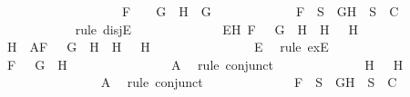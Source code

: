 \begin{isabellebody}
\ \ \ \ \ \ \ \ \ \ \ \ \ \ \ \ \ \ \ F\ {\isacharequal}\ \isactrlbold {\isasymnot}\ {\isacharparenleft}\isactrlbold {\isasymnot}\ G{\isacharparenright}\ {\isasymand}\ H\ {\isacharequal}\ G{\isachardoublequoteclose}\ \isanewline
\ \ \ \ \ \ \ \ \ \ \isamarkupfalse%
\ {\isachardoublequoteopen}F\ {\isasymin}\ S\ {\isasymlongrightarrow}\ {\isacharbraceleft}G{\isacharcomma}H{\isacharbraceright}\ {\isasymunion}\ S\ {\isasymin}\ C{\isachardoublequoteclose}\isanewline
\ \ \ \ \ \ \ \ \ \ \isamarkupfalse%
\ {\isacharparenleft}rule\ disjE{\isacharparenright}\isanewline
\ \ \ \ \ \ \ \ \ \ \ \ \isamarkupfalse%
\ E{}{\isacharcolon}{\isachardoublequoteopen}{\isasymexists}H{}{\isachardot}\ F\ {\isacharequal}\ \isactrlbold {\isasymnot}\ {\isacharparenleft}G\ \isactrlbold {\isasymrightarrow}\ H{}{\isacharparenright}\ {\isasymand}\ H\ {\isacharequal}\ \isactrlbold {\isasymnot}\ H{}{\isachardoublequoteclose}\isanewline
\ \ \ \ \ \ \ \ \ \ \ \ \isamarkupfalse%
\ H{}\ \ A{}{\isacharcolon}{\isachardoublequoteopen}F\ {\isacharequal}\ \isactrlbold {\isasymnot}\ {\isacharparenleft}G\ \isactrlbold {\isasymrightarrow}\ H{}{\isacharparenright}\ {\isasymand}\ H\ {\isacharequal}\ \isactrlbold {\isasymnot}\ H{}{\isachardoublequoteclose}\isanewline
\ \ \ \ \ \ \ \ \ \ \ \ \ \ \isamarkupfalse%
\ E{}\ \isamarkupfalse%
\ {\isacharparenleft}rule\ exE{\isacharparenright}\isanewline
\ \ \ \ \ \ \ \ \ \ \ \ \isamarkupfalse%
\ {\isachardoublequoteopen}F\ {\isacharequal}\ \isactrlbold {\isasymnot}\ {\isacharparenleft}G\ \isactrlbold {\isasymrightarrow}\ H{}{\isacharparenright}{\isachardoublequoteclose}\isanewline
\ \ \ \ \ \ \ \ \ \ \ \ \ \ \isamarkupfalse%
\ A{}\ \isamarkupfalse%
\ {\isacharparenleft}rule\ conjunct{}{\isacharparenright}\isanewline
\ \ \ \ \ \ \ \ \ \ \ \ \isamarkupfalse%
\ {\isachardoublequoteopen}H\ {\isacharequal}\ \isactrlbold {\isasymnot}\ H{}{\isachardoublequoteclose}\isanewline
\ \ \ \ \ \ \ \ \ \ \ \ \ \ \isamarkupfalse%
\ A{}\ \isamarkupfalse%
\ {\isacharparenleft}rule\ conjunct{}{\isacharparenright}\isanewline
\ \ \ \ \ \ \ \ \ \ \ \ \isamarkupfalse%
\ {\isachardoublequoteopen}F\ {\isasymin}\ S\ {\isasymlongrightarrow}\ {\isacharbraceleft}G{\isacharcomma}H{\isacharbraceright}\ {\isasymunion}\ S\ {\isasymin}\ C{\isachardoublequoteclose}\isanewline

\end{isabellebody}
